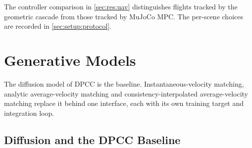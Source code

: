 The controller comparison in \autoref{sec:res:uav} distinguishes flights tracked by the geometric
cascade from those tracked by MuJoCo MPC. The per-scene choices are recorded in
\autoref{sec:setup:protocol}.

\section{Generative Models}\label{sec:method:engine}

The diffusion model of \ac{DPCC} is the baseline. Instantaneous-velocity matching, analytic
average-velocity matching and consistency-interpolated average-velocity matching replace it
behind one interface, each with its own training target and integration loop.

\subsection{Diffusion and the DPCC Baseline}\label{sec:method:diffusion}

